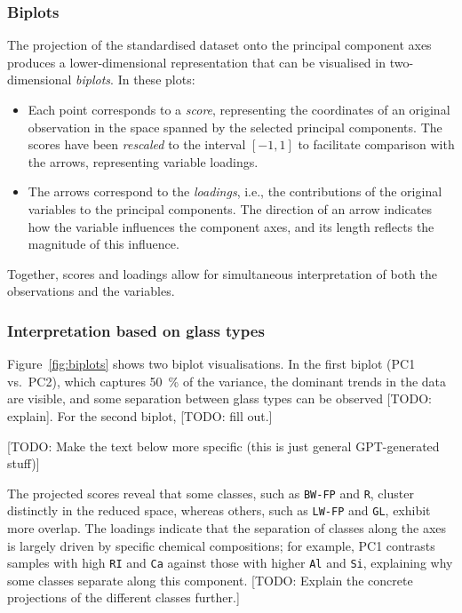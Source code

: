 \documentclass[dtu]{dtuarticle}
\newcommand{\todo}[1]{\color{red}[TODO: #1]\color{black}}
\begin{document}
	\subsubsection{Biplots}

	The projection of the standardised dataset onto the principal component axes produces a lower-dimensional representation that can be visualised in two-dimensional \textit{biplots}. In these plots:

	\begin{itemize}
		\item Each point corresponds to a \textit{score}, representing the coordinates of an original observation in the space spanned by the selected principal components. The scores have been \textit{rescaled} to the interval $[-1,1]$ to facilitate comparison with the arrows, representing variable loadings.
		\item The arrows correspond to the \textit{loadings}, i.e., the contributions of the original variables to the principal components. The direction of an arrow indicates how the variable influences the component axes, and its length reflects the magnitude of this influence.
	\end{itemize}

	Together, scores and loadings allow for simultaneous interpretation of both the observations and the variables.

	\subsubsection{Interpretation based on glass types}

	Figure~\ref{fig:biplots} shows two biplot visualisations. In the first biplot (PC1 vs.\ PC2), which captures \SI{50}{\percent} of the variance, the dominant trends in the data are visible, and some separation between glass types can be observed \todo{explain}. For the second biplot, \todo{fill out.}

	\todo{Make the text below more specific (this is just general GPT-generated stuff)}

	The projected scores reveal that some classes, such as \texttt{BW-FP} and \texttt{R}, cluster distinctly in the reduced space, whereas others, such as \texttt{LW-FP} and \texttt{GL}, exhibit more overlap. The loadings indicate that the separation of classes along the axes is largely driven by specific chemical compositions; for example, PC1 contrasts samples with high \texttt{RI} and \texttt{Ca} against those with higher \texttt{Al} and \texttt{Si}, explaining why some classes separate along this component. \todo{Explain the concrete projections of the different classes further.}
\end{document}
